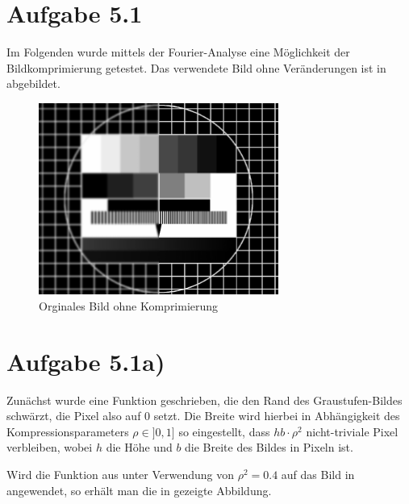 \section*{Aufgabe 5.1}
Im Folgenden wurde mittels der Fourier-Analyse eine Möglichkeit der Bildkomprimierung
getestet. Das verwendete Bild ohne Veränderungen ist in  abgebildet.

\begin{figure}[htb]
\centering
  \includegraphics[width=0.7\textwidth,keepaspectratio]{../tmp/testbild.pdf}
  \caption{Orginales Bild ohne Komprimierung}
  \label{fig:orig}
\end{figure}

\section*{Aufgabe 5.1a)}

Zunächst wurde eine Funktion  geschrieben, die den Rand des Graustufen-Bildes
schwärzt, die Pixel also auf 0 setzt. Die Breite wird hierbei in Abhängigkeit
des Kompressionsparameters $ρ \in ]0,1]$ so eingestellt, dass $hb\cdot ρ^2$
nicht-triviale Pixel verbleiben, wobei $h$ die Höhe und $b$ die Breite des
Bildes in Pixeln ist.

Wird die Funktion aus  unter Verwendung von $ρ^2 = 0.4$ auf das
Bild in  angewendet, so erhält man die in  gezeigte Abbildung.



